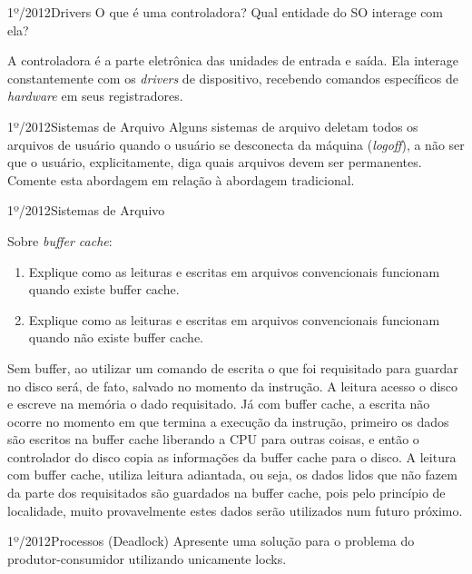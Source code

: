 \begin{exercicio}
  {1º/2012}{Drivers}
  {O que é uma controladora? Qual entidade do SO interage com ela?}

  A controladora é a parte eletrônica das unidades de entrada e saída. Ela interage constantemente com os \textit{drivers} de dispositivo, recebendo comandos específicos de \textit{hardware} em seus registradores.
\end{exercicio}

\begin{exercicio}
  {1º/2012}{Sistemas de Arquivo}
  {Alguns sistemas de arquivo deletam todos os arquivos de usuário quando o usuário se desconecta da máquina (\textit{logoff}), a não ser que o usuário, explicitamente, diga quais arquivos devem ser permanentes. Comente esta abordagem em relação à abordagem tradicional.}
\end{exercicio}

\begin{exercicio}
  {1º/2012}{Sistemas de Arquivo}
  {Sobre \textit{buffer cache}:
  \begin{enumerate}[label=(\alph*)]
    \item Explique como as leituras e escritas em arquivos convencionais funcionam quando existe buffer cache.
    \item Explique como as leituras e escritas em arquivos convencionais funcionam quando não existe buffer cache.
  \end{enumerate}}
  Sem buffer, ao utilizar um comando de escrita o que foi requisitado para guardar no disco será, de fato, salvado no momento da instrução. A leitura acesso o disco e escreve na memória o dado requisitado.
  Já com buffer cache, a escrita não ocorre no momento em que termina a execução da instrução, primeiro os dados são escritos na buffer cache liberando a CPU para outras coisas, e então o controlador do disco copia as informações da buffer cache para o disco.
  A leitura com buffer cache, utiliza leitura adiantada, ou seja, os dados lidos que não fazem da parte dos requisitados são guardados na buffer cache, pois pelo princípio de localidade, muito provavelmente estes dados serão utilizados num futuro próximo.
\end{exercicio}

\begin{exercicio}
  {1º/2012}{Processos (Deadlock)}
  {Apresente uma solução para o problema do produtor-consumidor utilizando unicamente locks.}
\end{exercicio}

